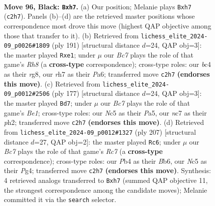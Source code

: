\documentclass[11pt]{article}
\begin{document}
\clearpage

\begin{figure}[p]\centering
\begin{subfigure}{0.46\textwidth}\centering
\resizebox{\linewidth}{!}{%
\newchessgame
\chessboard[
  setfen={8/2N2P1R/8/2n5/1pB3Pk/8/2b2K2/8 b - - 2 96},
  showmover=false,
  pgfstyle=straightmove, color=movearrow, markmove={c2-h7}
]}
\caption{}
\end{subfigure}\hfill
\begin{subfigure}{0.46\textwidth}\centering
\resizebox{\linewidth}{!}{%
\newchessgame
\chessboard[
  setfen={6R1/8/p4b2/3k1b2/p7/2P2K2/1P6/4B2r b - - 0 96},
  showmover=false,
  pgfstyle=straightmove, color=movearrow, markmove={h1-e1}
]}
\caption{}
\end{subfigure}
\\[4pt]
\begin{subfigure}{0.46\textwidth}\centering
\resizebox{\linewidth}{!}{%
\newchessgame
\chessboard[
  setfen={4b3/8/8/p2k2p1/P7/3K4/7P/3B4 b - - 49 89},
  showmover=false,
  pgfstyle=straightmove, color=movearrow, markmove={e8-d7}
]}
\caption{}
\end{subfigure}\hfill
\begin{subfigure}{0.46\textwidth}\centering
\resizebox{\linewidth}{!}{%
\newchessgame
\chessboard[
  setfen={8/8/1b4k1/8/6p1/1N4P1/2r1RP2/5K2 b - - 88 104},
  showmover=false,
  pgfstyle=straightmove, color=movearrow, markmove={c2-c6}
]}
\caption{}
\end{subfigure}
\caption{\textbf{Move 96, Black: \texttt{Bxh7}.} (a) Our position; Melanie plays \texttt{Bxh7} (\texttt{c2h7}). Panels (b)--(d) are the retrieved master positions whose correspondence most drove this move (highest QAP objective among those that transfer to it). (b) Retrieved from \texttt{lichess\_elite\_2024-09\_p0026\#1809} (ply 191) [structural distance $d$=24, QAP obj=3]: the master played \texttt{Rxe1}; under $\mu$ our \emph{Bc7} plays the role of that game's \emph{Rh8} (a \textbf{cross-type} correspondence); cross-type roles: our \emph{b}c4 as their \emph{r}g8, our \emph{r}h7 as their \emph{P}a6; transferred move \texttt{c2h7} \textbf{(endorses this move)}. (c) Retrieved from \texttt{lichess\_elite\_2024-09\_p0012\#2506} (ply 177) [structural distance $d$=24, QAP obj=3]: the master played \texttt{Bd7}; under $\mu$ our \emph{Bc7} plays the role of that game's \emph{Be1}; cross-type roles: our \emph{N}c5 as their \emph{P}a5, our \emph{n}c7 as their \emph{p}h2; transferred move \texttt{c2h7} \textbf{(endorses this move)}. (d) Retrieved from \texttt{lichess\_elite\_2024-09\_p0012\#1327} (ply 207) [structural distance $d$=27, QAP obj=2]: the master played \texttt{Rc6}; under $\mu$ our \emph{Bc7} plays the role of that game's \emph{Rc7} (a \textbf{cross-type} correspondence); cross-type roles: our \emph{P}b4 as their \emph{B}b6, our \emph{N}c5 as their \emph{P}g4; transferred move \texttt{c2h7} \textbf{(endorses this move)}. Synthesis: 4 retrieved analogs transferred to \texttt{Bxh7} (summed QAP objective 11, the strongest correspondence among the candidate moves); Melanie committed it via the \texttt{search} selector.}
\label{fig:thought-m191}
\end{figure}
\end{document}
